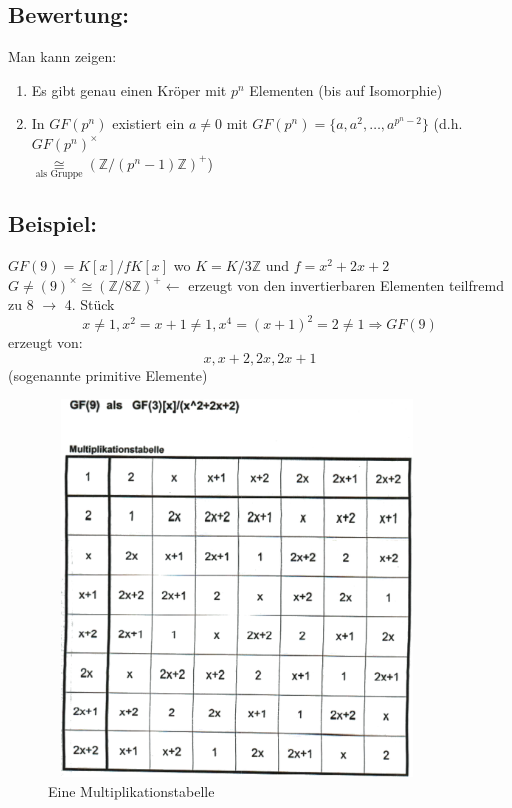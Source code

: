 \subsection{Bewertung:} 
Man kann zeigen:
\begin{enumerate}[label={(\alph*)}]
	\item Es gibt genau einen Kröper mit $p^{n}$ Elementen (bis auf Isomorphie)
	\item In $GF(p^{n})$ existiert ein $a \neq 0$ mit $GF(p^{n})=\{a,a^{2},\dotsc, 
			a^{p^{n}-2}\}$ (d.h. $GF(p^{n})^{\times}$ \\
			$\mathop{\cong}\limits_{\text{als Gruppe}}
			(\mathbb{Z}/(p^{n}-1)\mathbb{Z})^{+}$)
\end{enumerate}
%
%
%
\subsection{Beispiel:}
$GF(9) = K[x]/fK[x]$ wo $K = K/3\mathbb{Z}$ und $f=x^{2}+2x+2$\\
$G \neq (9)^{\times} \cong ( \mathbb{Z}/8\mathbb{Z})^{+} \leftarrow$ erzeugt von den invertierbaren Elementen teilfremd zu 8 $\rightarrow$ 4. Stück\\
\begin{equation*}
x \neq 1, x^{2}=x+1 \neq 1, x^{4} = (x+1)^{2}=2 \neq 1 \Rightarrow GF(9)
\end{equation*}
erzeugt von:
\begin{equation*}
x, x+2, 2x, 2x+1
\end{equation*}
(sogenannte primitive Elemente)

\begin{figure} [H]
\centering 
\includegraphics[width=10cm, height=10cm]{mainmatter/chapter3/pics/multitabelle.png}
\caption{Eine Multiplikationstabelle} 
\end{figure}
